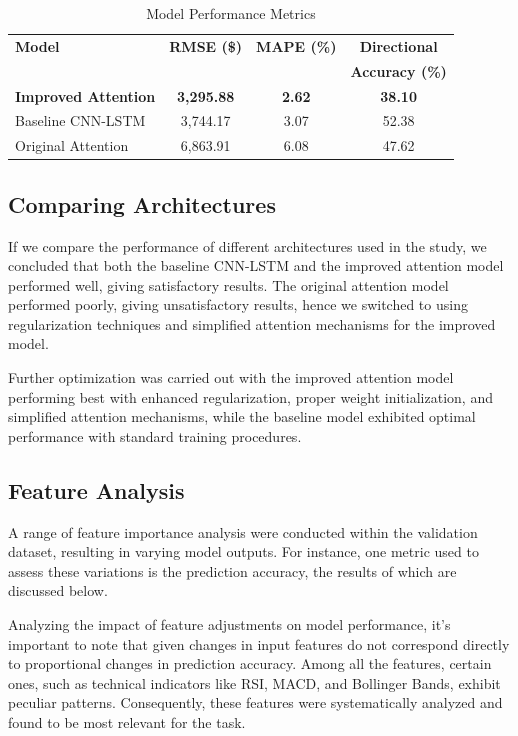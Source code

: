 \documentclass[conference]{IEEEtran}
\begin{document}
\begin{table}[htbp]
\caption{Model Performance Metrics}
\begin{center}
\begin{tabular}{|l|c|c|c|}
\hline
\textbf{Model} & \textbf{RMSE (\$)} & \textbf{MAPE (\%)} & \textbf{Directional}\\
 & & & \textbf{Accuracy (\%)} \\
\hline
\textbf{Improved Attention} & \textbf{3,295.88} & \textbf{2.62} & \textbf{38.10}\\
Baseline CNN-LSTM & 3,744.17 & 3.07 & 52.38 \\
Original Attention & 6,863.91 & 6.08 & 47.62 \\
\hline
\end{tabular}
\label{tab:performance}
\end{center}
\end{table}

\subsection{Comparing Architectures}

If we compare the performance of different architectures used in the study, we concluded that both the baseline CNN-LSTM and the improved attention model performed well, giving satisfactory results. The original attention model performed poorly, giving unsatisfactory results, hence we switched to using regularization techniques and simplified attention mechanisms for the improved model.

Further optimization was carried out with the improved attention model performing best with enhanced regularization, proper weight initialization, and simplified attention mechanisms, while the baseline model exhibited optimal performance with standard training procedures.

\subsection{Feature Analysis}

A range of feature importance analysis were conducted within the validation dataset, resulting in varying model outputs. For instance, one metric used to assess these variations is the prediction accuracy, the results of which are discussed below.

Analyzing the impact of feature adjustments on model performance, it's important to note that given changes in input features do not correspond directly to proportional changes in prediction accuracy. Among all the features, certain ones, such as technical indicators like RSI, MACD, and Bollinger Bands, exhibit peculiar patterns. Consequently, these features were systematically analyzed and found to be most relevant for the task.
\end{document}
